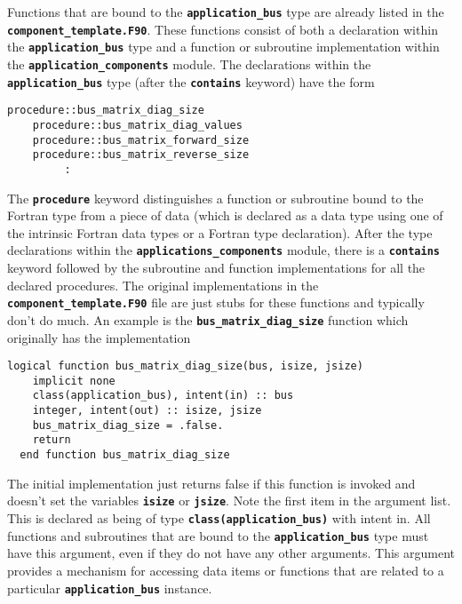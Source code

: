 Functions that are bound to the \texttt{\textbf{application\_bus}} type are already listed in the \texttt{\textbf{component\_template.F90}}. These functions consist of both a declaration within the \texttt{\textbf{application\_bus}} type and a function or subroutine implementation within the \texttt{\textbf{application\_components}} module. The declarations within the \texttt{\textbf{application\_bus}} type (after the \texttt{\textbf{contains}} keyword) have the form

{
\color{red}
\begin{Verbatim}[fontseries=b]
    procedure::bus_matrix_diag_size
    procedure::bus_matrix_diag_values
    procedure::bus_matrix_forward_size
    procedure::bus_matrix_reverse_size
         :
\end{Verbatim}
}

The \texttt{\textbf{procedure}} keyword distinguishes a function or subroutine bound to the Fortran type from a piece of data (which is declared as a data type using one of the intrinsic Fortran data types or a Fortran type declaration).
After the type declarations within the \texttt{\textbf{applications\_components}} module, there is a \texttt{\textbf{contains}} keyword followed by the subroutine and function implementations for all the declared procedures. The original implementations in the \texttt{\textbf{component\_template.F90}} file are just stubs for these functions and typically don't do much. An example is the \texttt{\textbf{bus\_matrix\_diag\_size}} function which originally has the implementation

{
\color{red}
\begin{Verbatim}[fontseries=b]
  logical function bus_matrix_diag_size(bus, isize, jsize)
    implicit none
    class(application_bus), intent(in) :: bus
    integer, intent(out) :: isize, jsize
    bus_matrix_diag_size = .false.
    return
  end function bus_matrix_diag_size
\end{Verbatim}
}

The initial implementation just returns false if this function is invoked and doesn't set the variables \texttt{\textbf{isize}} or \texttt{\textbf{jsize}}. Note the first item in the argument list. This is declared as being of type \texttt{\textbf{class(application\_bus)}} with intent in. All functions and subroutines that are bound to the \texttt{\textbf{application\_bus}} type must have this argument, even if they do not have any other arguments. This argument provides a mechanism for accessing data items or functions that are related to a particular \texttt{\textbf{application\_bus}} instance.

